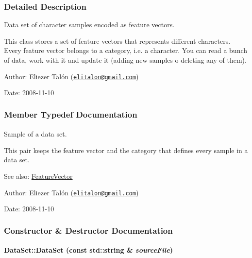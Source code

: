 \subsubsection{Detailed Description}
Data set of character samples encoded as feature vectors. 

This class stores a set of feature vectors that represents different characters. Every feature vector belongs to a category, i.e. a character. You can read a bunch of data, work with it and update it (adding new samples o deleting any of them).

\begin{Desc}
\item[Author:]Eliezer Talón (\href{mailto:elitalon@gmail.com}{\tt elitalon@gmail.com}) \end{Desc}
\begin{Desc}
\item[Date:]2008-11-10 \end{Desc}


\subsubsection{Member Typedef Documentation}
\hypertarget{class_data_set_7563096ce4847d88411ed3f6ad331310}{
\paragraph[{Sample}]{}\hfill}
\label{class_data_set_7563096ce4847d88411ed3f6ad331310}


Sample of a data set. 

This pair keeps the feature vector and the category that defines every sample in a data set.

\begin{Desc}
\item[See also:]\hyperlink{class_feature_vector}{FeatureVector}\end{Desc}
\begin{Desc}
\item[Author:]Eliezer Talón (\href{mailto:elitalon@gmail.com}{\tt elitalon@gmail.com}) \end{Desc}
\begin{Desc}
\item[Date:]2008-11-10 \end{Desc}


\subsubsection{Constructor \& Destructor Documentation}
\hypertarget{class_data_set_1d2ca0edda13ea88e9962ea3c4cf1ed4}{
\paragraph[{DataSet}]{\setlength{\rightskip}{0pt plus 5cm}DataSet::DataSet (const std::string \& {\em sourceFile})}\hfill}
\label{class_data_set_1d2ca0edda13ea88e9962ea3c4cf1ed4}


